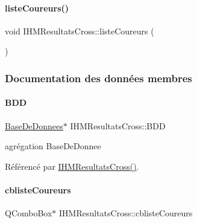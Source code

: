 \paragraph{\texorpdfstring{liste\+Coureurs()}{listeCoureurs()}}
{\footnotesize\ttfamily void I\+H\+M\+Resultats\+Cross\+::liste\+Coureurs (\begin{DoxyParamCaption}{ }\end{DoxyParamCaption})\hspace{0.3cm}{\ttfamily [private]}}



\subsubsection{Documentation des données membres}
\mbox{\label{class_i_h_m_resultats_cross_a3f27f95ca0fb27d1a46814d2fddfc3b1}} 
\paragraph{\texorpdfstring{B\+DD}{BDD}}
{\footnotesize\ttfamily \hyperlink{class_base_de_donnees}{Base\+De\+Donnees}$\ast$ I\+H\+M\+Resultats\+Cross\+::\+B\+DD\hspace{0.3cm}{\ttfamily [private]}}



agrégation Base\+De\+Donnee 



Référencé par \hyperlink{class_i_h_m_resultats_cross_a94afa0356ebc98e497dfecca3e1bb00b}{I\+H\+M\+Resultats\+Cross()}.

\mbox{\label{class_i_h_m_resultats_cross_ae1190e783fc117504abf614fe170ad54}} 
\paragraph{\texorpdfstring{cbliste\+Coureurs}{cblisteCoureurs}}
{\footnotesize\ttfamily Q\+Combo\+Box$\ast$ I\+H\+M\+Resultats\+Cross\+::cbliste\+Coureurs\hspace{0.3cm}{\ttfamily [private]}}



